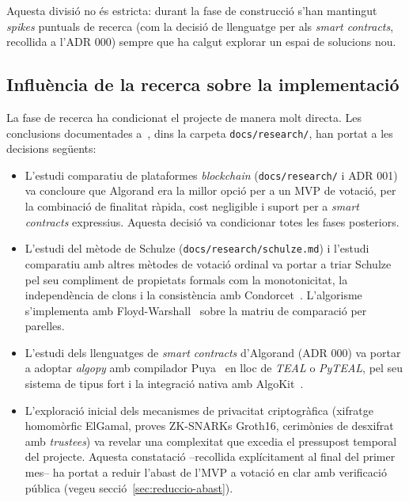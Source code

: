 Aquesta divisió no és estricta: durant la fase de construcció s'han mantingut \emph{spikes} puntuals de recerca (com la
decisió de llenguatge per als \emph{smart contracts}, recollida a l'\ac{ADR} 000) sempre que ha calgut explorar un espai
de solucions nou.

\subsection{Influència de la recerca sobre la implementació}
\label{subsec:influencia-recerca}

La fase de recerca ha condicionat el projecte de manera molt directa.
Les conclusions documentades a~\cite{demochainrepo}, dins la carpeta \texttt{docs/research/}, han portat a les decisions
següents:

\begin{itemize}
    \item L'estudi comparatiu de plataformes \emph{blockchain} (\texttt{docs/research/} i \ac{ADR} 001) va concloure que
    Algorand era la millor opció per a un \ac{MVP} de votació, per la combinació de finalitat ràpida, cost negligible i
    suport per a \emph{smart contracts} expressius.
    Aquesta decisió va condicionar totes les fases posteriors.

    \item L'estudi del mètode de Schulze (\texttt{docs/research/schulze.md}) i l'estudi comparatiu amb altres mètodes de
    votació ordinal va portar a triar Schulze pel seu compliment de propietats formals com la monotonicitat, la
    independència de clons i la consistència amb Condorcet~\cite{schulze2011newmethod}.
    L'algorisme s'implementa amb Floyd-Warshall~\cite{floyd1962algorithm} sobre la matriu de comparació per parelles.

    \item L'estudi dels llenguatges de \emph{smart contracts} d'Algorand (\ac{ADR} 000) va portar a adoptar
    \emph{algopy} amb compilador Puya~\cite{algorandfoundation2024puya} en lloc de \emph{TEAL} o \emph{PyTEAL}, pel seu
    sistema de tipus fort i la integració nativa amb AlgoKit~\cite{algorandfoundation2024algokit}.

    \item L'exploració inicial dels mecanismes de privacitat criptogràfica (xifratge homomòrfic ElGamal, proves
    \acsp{ZK-SNARK} Groth16, cerimònies de desxifrat amb \emph{trustees}) va revelar una complexitat que excedia el
    pressupost temporal del projecte.
    Aquesta constatació --recollida explícitament al final del primer mes-- ha portat a reduir l'abast de l'\ac{MVP} a
    votació en clar amb verificació pública (vegeu secció~\ref{sec:reduccio-abast}).
\end{itemize}

